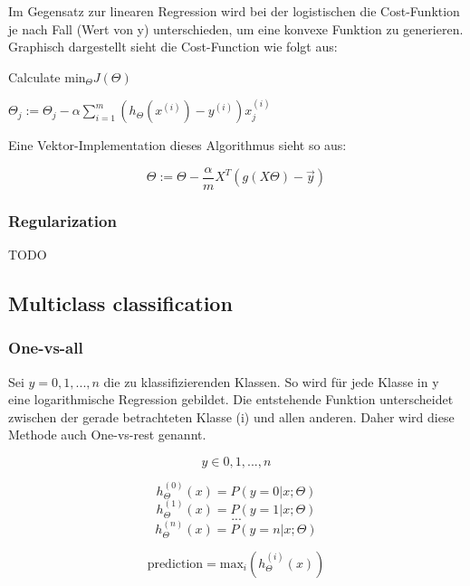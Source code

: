 \begin{flushleft}
Im Gegensatz zur linearen Regression wird bei der logistischen die Cost-Funktion je nach Fall (Wert von y) unterschieden, um eine konvexe Funktion zu generieren.
Graphisch dargestellt sieht die Cost-Function wie folgt aus:



\begin{algorithm}
\caption{Calculate $\text{min}_{\Theta} J(\Theta)$}
\begin{algorithmic} 
\REPEAT 
\STATE $ \Theta_{j} := \Theta_{j} - \alpha\sum_{i=1}^{m}(h_{\Theta}(x^{(i)}) - y^{(i)})x_{j}^{(i)} $
\end{algorithmic}
\end{algorithm}

Eine Vektor-Implementation dieses Algorithmus sieht so aus:

$$ \Theta := \Theta - \frac{\alpha}{m} X^{T}(g(X\Theta) - \vec{y}) $$

\subsubsection{Regularization}

TODO


\subsection{Multiclass classification}
\subsubsection{One-vs-all}

Sei $y = {0, 1, ..., n}$ die zu klassifizierenden Klassen. So wird für jede Klasse in y eine logarithmische Regression gebildet. Die entstehende Funktion unterscheidet zwischen der gerade betrachteten Klasse (i) und allen anderen. Daher wird diese Methode auch One-vs-rest genannt.

$$ y \in {0, 1, ..., n} $$

$$ h_{\Theta}^{(0)}(x) = P(y=0|x;\Theta) $$
$$ h_{\Theta}^{(1)}(x) = P(y=1|x;\Theta) $$
$$ \text{...} $$
$$ h_{\Theta}^{(n)}(x) = P(y=n|x;\Theta) $$

$$ \text{prediction} = \text{max}_{i}(h_{\Theta}^{(i)}(x)) $$








\end{flushleft}



